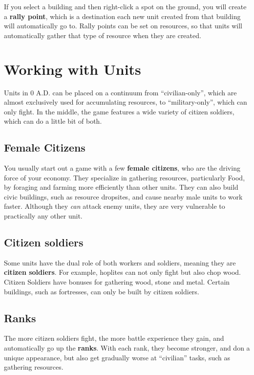 \documentclass[a4paper,titlepage]{article}
\begin{document}
If you select a building and then right-click a spot on the ground, you will create a \textbf{rally point}, which is a destination each new unit created from that building will automatically go to. Rally points can be set on resources, so that units will automatically gather that type of resource when they are created.

\clearpage

\section{Working with Units}

Units in 0 A.D. can be placed on a continuum from “civilian-only”, which are almost exclusively used for accumulating resources, to “military-only”, which can only fight. In the middle, the game features a wide variety of citizen soldiers, which can do a little bit of both.

\subsection*{Female Citizens}

You usually start out a game with a few \textbf{female citizens}, who are the driving force of your economy. They specialize in gathering resources, particularly Food, by foraging and farming more efficiently than other units. They can also build civic buildings, such as resource dropsites, and cause nearby male units to work faster. Although they \emph{can} attack enemy units, they are very vulnerable to practically any other unit.

\subsection*{Citizen soldiers}

Some units have the dual role of both workers and soldiers, meaning they are \textbf{citizen soldiers}. For example, hoplites can not only fight but also chop wood. Citizen Soldiers have bonuses for gathering wood, stone and metal. Certain buildings, such as fortresses, can only be built by citizen soldiers.

\subsection*{Ranks}

The more citizen soldiers fight, the more battle experience they gain, and automatically go up the \textbf{ranks}. With each rank, they become stronger, and don a unique appearance, but also get gradually worse at “civilian” tasks, such as gathering resources.
\end{document}
